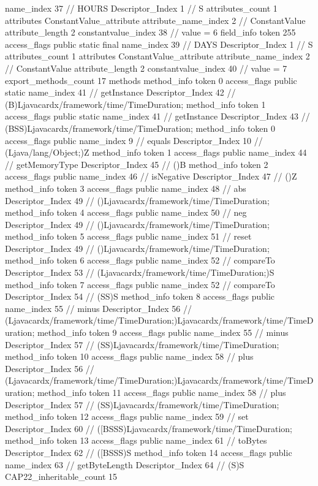 {{{{{				name_index	37		// HOURS
				Descriptor_Index	1		// S
				attributes_count	1
				attributes {
				ConstantValue_attribute {
					attribute_name_index	2		// ConstantValue
					attribute_length	2
					constantvalue_index	38		// value = 6
				}
				}
			}
			field_info {
				token	255
				access_flags	public static final
				name_index	39		// DAYS
				Descriptor_Index	1		// S
				attributes_count	1
				attributes {
				ConstantValue_attribute {
					attribute_name_index	2		// ConstantValue
					attribute_length	2
					constantvalue_index	40		// value = 7
				}
				}
			}
			}
			export_methods_count	17
			methods {
				method_info {
					token	0
					access_flags	public static
					name_index	41		// getInstance
					Descriptor_Index	42		// (B)Ljavacardx/framework/time/TimeDuration;
				}
				method_info {
					token	1
					access_flags	public static
					name_index	41		// getInstance
					Descriptor_Index	43		// (BSS)Ljavacardx/framework/time/TimeDuration;
				}
				method_info {
					token	0
					access_flags	public
					name_index	9		// equals
					Descriptor_Index	10		// (Ljava/lang/Object;)Z
				}
				method_info {
					token	1
					access_flags	public
					name_index	44		// getMemoryType
					Descriptor_Index	45		// ()B
				}
				method_info {
					token	2
					access_flags	public
					name_index	46		// isNegative
					Descriptor_Index	47		// ()Z
				}
				method_info {
					token	3
					access_flags	public
					name_index	48		// abs
					Descriptor_Index	49		// ()Ljavacardx/framework/time/TimeDuration;
				}
				method_info {
					token	4
					access_flags	public
					name_index	50		// neg
					Descriptor_Index	49		// ()Ljavacardx/framework/time/TimeDuration;
				}
				method_info {
					token	5
					access_flags	public
					name_index	51		// reset
					Descriptor_Index	49		// ()Ljavacardx/framework/time/TimeDuration;
				}
				method_info {
					token	6
					access_flags	public
					name_index	52		// compareTo
					Descriptor_Index	53		// (Ljavacardx/framework/time/TimeDuration;)S
				}
				method_info {
					token	7
					access_flags	public
					name_index	52		// compareTo
					Descriptor_Index	54		// (SS)S
				}
				method_info {
					token	8
					access_flags	public
					name_index	55		// minus
					Descriptor_Index	56		// (Ljavacardx/framework/time/TimeDuration;)Ljavacardx/framework/time/TimeDuration;
				}
				method_info {
					token	9
					access_flags	public
					name_index	55		// minus
					Descriptor_Index	57		// (SS)Ljavacardx/framework/time/TimeDuration;
				}
				method_info {
					token	10
					access_flags	public
					name_index	58		// plus
					Descriptor_Index	56		// (Ljavacardx/framework/time/TimeDuration;)Ljavacardx/framework/time/TimeDuration;
				}
				method_info {
					token	11
					access_flags	public
					name_index	58		// plus
					Descriptor_Index	57		// (SS)Ljavacardx/framework/time/TimeDuration;
				}
				method_info {
					token	12
					access_flags	public
					name_index	59		// set
					Descriptor_Index	60		// ([BSSS)Ljavacardx/framework/time/TimeDuration;
				}
				method_info {
					token	13
					access_flags	public
					name_index	61		// toBytes
					Descriptor_Index	62		// ([BSSS)S
				}
				method_info {
					token	14
					access_flags	public
					name_index	63		// getByteLength
					Descriptor_Index	64		// (S)S
				}
			}
			CAP22_inheritable_count	15
		}
	}
}
